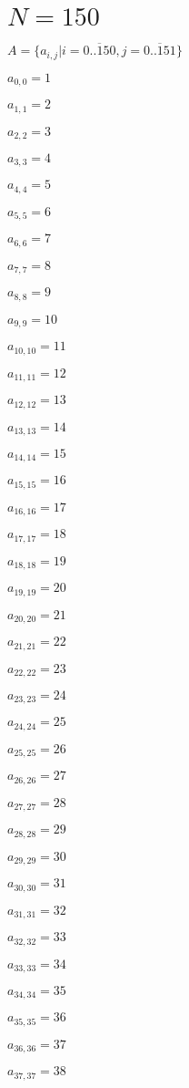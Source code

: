 \documentclass[a4paper,12pt]{article}
\begin{document}
\section{ $N = 150$ }
$A = \{ a _{ i, j } | i = \overline { 0..150 }, j = \overline { 0..151 } \}$

$a _{ 0, 0 } = 1$

$a _{ 1, 1 } = 2$

$a _{ 2, 2 } = 3$

$a _{ 3, 3 } = 4$

$a _{ 4, 4 } = 5$

$a _{ 5, 5 } = 6$

$a _{ 6, 6 } = 7$

$a _{ 7, 7 } = 8$

$a _{ 8, 8 } = 9$

$a _{ 9, 9 } = 10$

$a _{ 10, 10 } = 11$

$a _{ 11, 11 } = 12$

$a _{ 12, 12 } = 13$

$a _{ 13, 13 } = 14$

$a _{ 14, 14 } = 15$

$a _{ 15, 15 } = 16$

$a _{ 16, 16 } = 17$

$a _{ 17, 17 } = 18$

$a _{ 18, 18 } = 19$

$a _{ 19, 19 } = 20$

$a _{ 20, 20 } = 21$

$a _{ 21, 21 } = 22$

$a _{ 22, 22 } = 23$

$a _{ 23, 23 } = 24$

$a _{ 24, 24 } = 25$

$a _{ 25, 25 } = 26$

$a _{ 26, 26 } = 27$

$a _{ 27, 27 } = 28$

$a _{ 28, 28 } = 29$

$a _{ 29, 29 } = 30$

$a _{ 30, 30 } = 31$

$a _{ 31, 31 } = 32$

$a _{ 32, 32 } = 33$

$a _{ 33, 33 } = 34$

$a _{ 34, 34 } = 35$

$a _{ 35, 35 } = 36$

$a _{ 36, 36 } = 37$

$a _{ 37, 37 } = 38$
\end{document}
